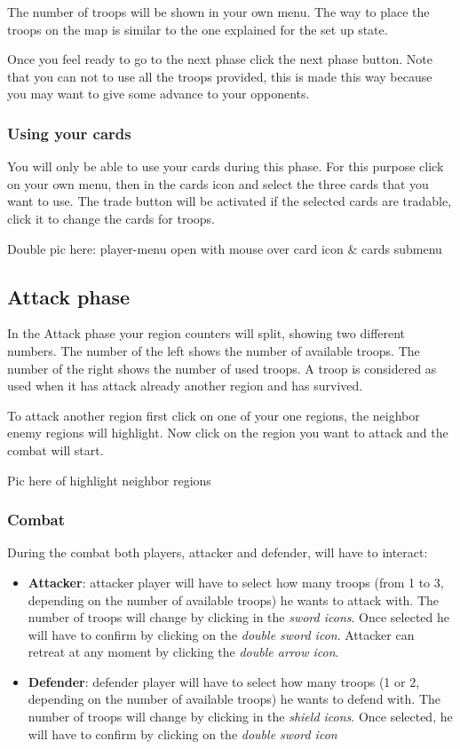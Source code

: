 \documentclass[12pt,a4paper]{article}
\begin{document}
The number of troops will be shown in your own menu. The way to place the troops on the map is similar to the one explained for the set up state.

Once you feel ready to go to the next phase click the next phase button. Note that you can not to use all the troops provided, this is made this way because you may want to give some advance to your opponents.

\subsubsection{Using your cards}
You will only be able to use your cards during this phase. For this purpose click on your own menu, then in the cards icon and select the three cards that you want to use. The trade button will be activated if the selected cards are tradable, click it to change the cards for troops.

\begin{todo}[Alberto]
  Double pic here: player-menu open with mouse over card icon \& cards submenu
\end{todo}

\subsection{Attack phase}
In the Attack phase your region counters will split, showing two different numbers. The number of the left shows the number of available troops. The number of the right shows the number of used troops. A troop is considered as used when it has attack already another region and has survived.

To attack another region first click on one of your one regions, the neighbor enemy regions will highlight. Now click on the region you want to attack and the combat will start.

\begin{todo}[Alberto]
  Pic here of highlight neighbor regions
\end{todo}

\subsubsection{Combat}
During the combat both players, attacker and defender, will have to interact:

\begin{itemize}
\item {\bf Attacker}: attacker player will have to select how many troops (from 1 to 3, depending on the number of available troops) he wants to attack with. The number of troops will change by clicking in the {\it sword icons}. Once selected he will have to confirm by clicking on the {\it double sword icon}. Attacker can retreat at any moment by clicking the {\it double arrow icon}.
\item {\bf Defender}: defender player will have to select how many troops (1 or 2, depending on the number of available troops) he wants to defend with. The number of troops will change by clicking in the {\it shield icons}. Once selected, he will have to confirm by clicking on the {\it double sword icon}
\end{itemize}
\end{document}
